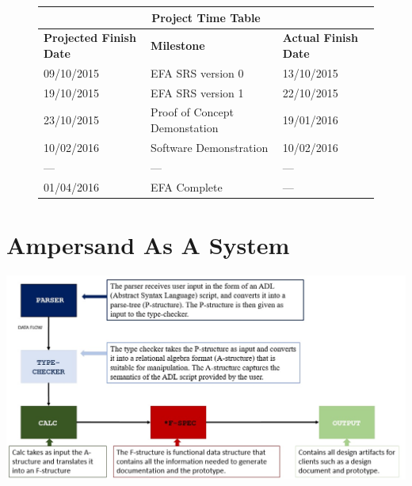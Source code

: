 \documentclass[12pt]{report}
\begin{document}
\newpage

\tableofcontents
\listoffigures
\listoftables

\newpage
{} %

\setlength{\arrayrulewidth}{0.35mm}
\setlength{\tabcolsep}{16pt}
\renewcommand{\arraystretch}{2}
\begin{figure}
	\begin{adjustwidth}{-1cm}{}
	\begin{tabular}{ |m{4cm}|m{6cm}|m{4cm}|  }
		\hline
		\multicolumn{3}{|c|}{\bfseries{Project Time Table}} \\
		\hline
		\bfseries{Projected Finish Date}& \bfseries{Milestone} & 
		\bfseries{Actual Finish Date} \\
		\hline
		 09/10/2015& EFA SRS version 0 & 13/10/2015 \\
		19/10/2015 & EFA SRS version 1  & 22/10/2015 \\
		23/10/2015 & Proof of Concept Demonstation & 19/01/2016 \\
		10/02/2016 & Software Demonstration & 10/02/2016 \\
		--- & --- & --- \\
		01/04/2016 & EFA Complete & --- \\
		\hline
	\end{tabular}
	\end{adjustwidth}
\end{figure}
\chapter{Ampersand As A System}\label{ch:Intro}


\includegraphics[width=\textwidth]{../figures/ampersand_parts}
\end{document}
